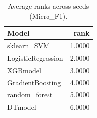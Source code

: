 \begin{table}[t]
\centering
\begin{tabular}{lr}
\toprule
Model & rank \\
\midrule
sklearn_SVM & 1.0000 \\
LogisticRegression & 2.0000 \\
XGBmodel & 3.0000 \\
GradientBoosting & 4.0000 \\
random_forest & 5.0000 \\
DTmodel & 6.0000 \\
\bottomrule
\end{tabular}
\caption{Average ranks across seeds (Micro_F1).}
\label{tab:avg_rank_Micro_F1}
\end{table}